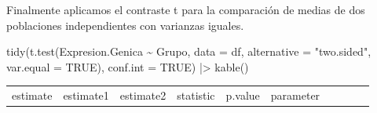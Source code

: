 \documentclass[
  a4paper,
]{scrreport}
\newenvironment{Shaded}{\begin{snugshade}}{\end{snugshade}}
\newcommand{\AttributeTok}[1]{\textcolor[rgb]{0.40,0.45,0.13}{#1}}
\newcommand{\ConstantTok}[1]{\textcolor[rgb]{0.56,0.35,0.01}{#1}}
\newcommand{\FunctionTok}[1]{\textcolor[rgb]{0.28,0.35,0.67}{#1}}
\newcommand{\NormalTok}[1]{\textcolor[rgb]{0.00,0.23,0.31}{#1}}
\newcommand{\SpecialCharTok}[1]{\textcolor[rgb]{0.37,0.37,0.37}{#1}}
\newcommand{\StringTok}[1]{\textcolor[rgb]{0.13,0.47,0.30}{#1}}
\theoremstyle{definition}
\theoremstyle{remark}
\begin{document}
\begin{tcolorbox}
Finalmente aplicamos el contraste t para la comparación de medias de dos
poblaciones independientes con varianzas iguales.

\begin{Shaded}
\begin{Highlighting}[]
\FunctionTok{tidy}\NormalTok{(}\FunctionTok{t.test}\NormalTok{(Expresion.Genica }\SpecialCharTok{\textasciitilde{}}\NormalTok{ Grupo, }\AttributeTok{data =}\NormalTok{ df, }\AttributeTok{alternative =} \StringTok{"two.sided"}\NormalTok{, }\AttributeTok{var.equal =} \ConstantTok{TRUE}\NormalTok{), }\AttributeTok{conf.int =} \ConstantTok{TRUE}\NormalTok{) }\SpecialCharTok{|\textgreater{}} 
    \FunctionTok{kable}\NormalTok{()}
\end{Highlighting}
\end{Shaded}

\begin{longtable}[]{@{}
  >{\raggedleft\arraybackslash}p{}
  >{\raggedleft\arraybackslash}p{}
  >{\raggedleft\arraybackslash}p{}
  >{\raggedleft\arraybackslash}p{}
  >{\raggedleft\arraybackslash}p{}
  >{\raggedleft\arraybackslash}p{}
  >{\raggedleft\arraybackslash}p{}
  >{\raggedleft\arraybackslash}p{}
  >{\raggedright\arraybackslash}p{}
  >{\raggedright\arraybackslash}p{}@{}}
\toprule\noalign{}
\begin{minipage}[b]{\linewidth}\raggedleft
estimate
\end{minipage} & \begin{minipage}[b]{\linewidth}\raggedleft
estimate1
\end{minipage} & \begin{minipage}[b]{\linewidth}\raggedleft
estimate2
\end{minipage} & \begin{minipage}[b]{\linewidth}\raggedleft
statistic
\end{minipage} & \begin{minipage}[b]{\linewidth}\raggedleft
p.value
\end{minipage} & \begin{minipage}[b]{\linewidth}\raggedleft
parameter
\end{minipage} & \begin{minipage}[b]{\linewidth}\raggedleft

\end{minipage}
\end{longtable}
\end{tcolorbox}
\end{document}
